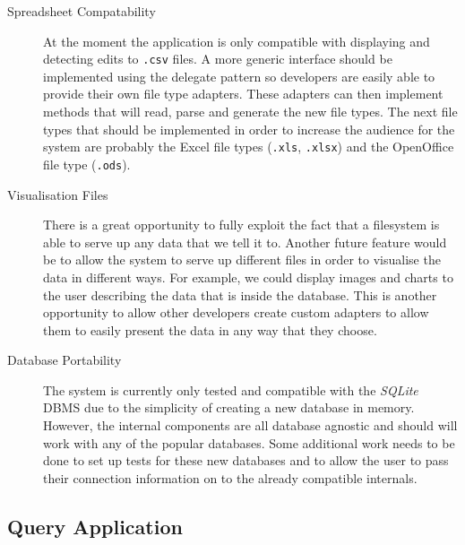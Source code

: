 \begin{description}

	\item[Spreadsheet Compatability] \hfill

		At the moment the application is only compatible with displaying and
		detecting edits to \texttt{.csv} files. A more generic interface should
		be implemented using the delegate pattern so developers are easily able
		to provide their own file type adapters. These adapters can then
		implement methods that will read, parse and generate the new file
		types. The next file types that should be implemented in order to
		increase the audience for the system are probably the Excel file types
		(\texttt{.xls}, \texttt{.xlsx}) and the OpenOffice file type
		(\texttt{.ods}).

	\item[Visualisation Files] \hfill

		\nopagebreak

		There is a great opportunity to fully exploit the fact that
		a filesystem is able to serve up any data that we tell it to. Another
		future feature would be to allow the system to serve up different files
		in order to visualise the data in different ways. For example, we could
		display images and charts to the user describing the data that is
		inside the database. This is another opportunity to allow other
		developers create custom adapters to allow them to easily present the
		data in any way that they choose.

	\item[Database Portability] \hfill

		The system is currently only tested and compatible with the
		\emph{SQLite} \ac{DBMS} due to the simplicity of creating a new
		database in memory. However, the internal components are all database
		agnostic and should will work with any of the popular databases. Some
		additional work needs to be done to set up tests for these new
		databases and to allow the user to pass their connection information on
		to the already compatible internals.

\end{description}

\subsection{Query Application}

